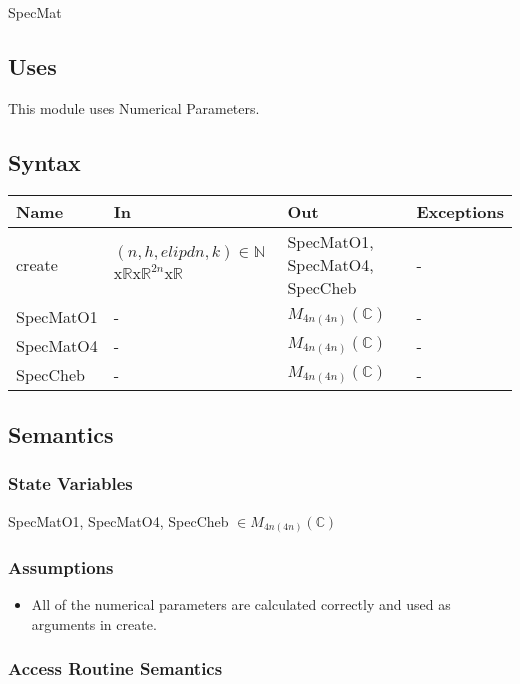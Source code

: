 \documentclass[12pt, titlepage]{article}
\begin{document}
SpecMat

\subsection{Uses}

This module uses Numerical Parameters. 

\subsection{Syntax}

\begin{center}
	\begin{tabular}{p{3cm} p{3cm} p{3cm} >{\raggedright\arraybackslash}p{7cm}}
		\toprule
		\textbf{Name} & \textbf{In} & \textbf{Out} & \textbf{Exceptions} \\
		\hline
		create & $(n,h,elipdn,k) \in
		\mathbb{N}$x$\mathbb{R}$x$\mathbb{R}^{2n}$x$\mathbb{R}$ & 
		SpecMatO1,
		SpecMatO4,
		SpecCheb & - \\
		SpecMatO1 & - & $M_{4n(4n)}(\mathbb{C})$ & - \\
		SpecMatO4 & - & $M_{4n(4n)}(\mathbb{C})$ & - \\ 
		SpecCheb & - & $M_{4n(4n)}(\mathbb{C})$ & - \\
		\hline
	\end{tabular}
\end{center}

\subsection{Semantics}

\subsubsection{State Variables}

SpecMatO1, SpecMatO4, SpecCheb $\in M_{4n(4n)}(\mathbb{C})$ 

\subsubsection{Assumptions}

\begin{itemize}
	\item All of the numerical parameters are calculated correctly and used as 
	arguments in create. 
\end{itemize}

\subsubsection{Access Routine Semantics}
\end{document}
